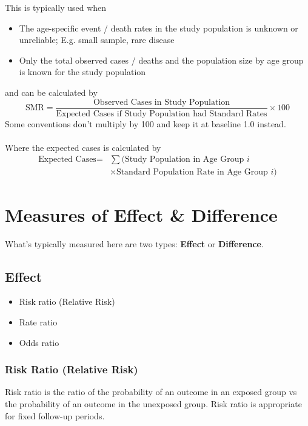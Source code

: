 \documentclass{article}
\begin{document}
\noindent This is typically used when
\begin{itemize}
    \item The age-specific event / death rates in the study population is unknown or unreliable; E.g. small sample, rare disease
    \item Only the total observed cases / deaths and the population size by age group is known for the study population
\end{itemize}
and can be calculated by
\begin{equation}
    \text{SMR} = \frac{\text{Observed Cases in Study Population}}{\text{Expected Cases if Study Population had Standard Rates}} \times 100
\end{equation}
Some conventions don't multiply by 100 and keep it at baseline 1.0 instead.
\\~\\
Where the expected cases is calculated by
\begin{equation}
\begin{split}
    \text{Expected Cases} = {} & \sum (\text{Study Population in Age Group } i \\
    & \times \text{Standard Population Rate in Age Group } i)
\end{split}
\end{equation}


\pagebreak
\section{Measures of Effect \& Difference}
What's typically measured here are two types: \textbf{Effect} or \textbf{Difference}.

\subsection{Effect}
\begin{itemize}
    \item Risk ratio (Relative Risk)
    \item Rate ratio
    \item Odds ratio
\end{itemize}

\subsubsection{Risk Ratio (Relative Risk)}
Risk ratio is the ratio of the probability of an outcome in an exposed group vs the probability of an outcome
in the unexposed group. Risk ratio is appropriate for fixed follow-up periods.
\end{document}
